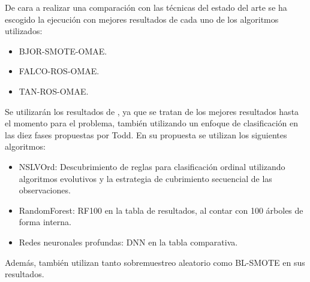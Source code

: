 De cara a realizar una comparación con las técnicas del estado del arte se ha escogido la ejecución con mejores resultados de cada uno de los algoritmos utilizados:

\begin{itemize}
	\item BJOR-SMOTE-OMAE.
	\item FALCO-ROS-OMAE.
	\item TAN-ROS-OMAE.
\end{itemize}

Se utilizarán los resultados de \cite{NSLVOrdAge}, ya que se tratan de los mejores resultados hasta el momento para el problema, también utilizando un enfoque de clasificación en las diez fases propuestas por Todd. En su propuesta se utilizan los siguientes algoritmos:

\begin{itemize}
	\item NSLVOrd\cite{NSLVOrd}: Descubrimiento de reglas para clasificación ordinal utilizando algoritmos evolutivos y la estrategia de cubrimiento secuencial de las observaciones.
	\item RandomForest: RF100 en la tabla de resultados, al contar con 100 árboles de forma interna.
	\item Redes neuronales profundas: DNN en la tabla comparativa.
\end{itemize}

Además, también utilizan tanto sobremuestreo aleatorio como BL-SMOTE en sus resultados.


